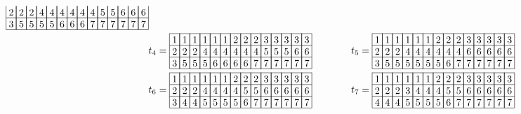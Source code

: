 \begin{align*}
\begin{array}[c]{*{14}c}
\lr{2}&\lr{2}&\lr{2}&\lr{4}&\lr{4}&\lr{4}&\lr{4}&\lr{4}&\lr{4}&\lr{5}&\lr{5}&\lr{6}&\lr{6}&\lr{6}\\\cline{1-14}
\lr{3}&\lr{5}&\lr{5}&\lr{5}&\lr{5}&\lr{6}&\lr{6}&\lr{6}&\lr{7}&\lr{7}&\lr{7}&\lr{7}&\lr{7}&\lr{7}\\\cline{1-14}
\end{array}\\
    &t_4 = \begin{array}[c]{*{14}c}\cline{1-14}
\lr{1}&\lr{1}&\lr{1}&\lr{1}&\lr{1}&\lr{1}&\lr{2}&\lr{2}&\lr{2}&\lr{3}&\lr{3}&\lr{3}&\lr{3}&\lr{3}\\\cline{1-14}
\lr{2}&\lr{2}&\lr{2}&\lr{4}&\lr{4}&\lr{4}&\lr{4}&\lr{4}&\lr{4}&\lr{5}&\lr{5}&\lr{5}&\lr{6}&\lr{6}\\\cline{1-14}
\lr{3}&\lr{5}&\lr{5}&\lr{5}&\lr{6}&\lr{6}&\lr{6}&\lr{6}&\lr{7}&\lr{7}&\lr{7}&\lr{7}&\lr{7}&\lr{7}\\\cline{1-14}
\end{array}\hspace{30pt}
    &t_5 = \begin{array}[c]{*{14}c}\cline{1-14}
\lr{1}&\lr{1}&\lr{1}&\lr{1}&\lr{1}&\lr{1}&\lr{2}&\lr{2}&\lr{2}&\lr{3}&\lr{3}&\lr{3}&\lr{3}&\lr{3}\\\cline{1-14}
\lr{2}&\lr{2}&\lr{2}&\lr{4}&\lr{4}&\lr{4}&\lr{4}&\lr{4}&\lr{4}&\lr{6}&\lr{6}&\lr{6}&\lr{6}&\lr{6}\\\cline{1-14}
\lr{3}&\lr{5}&\lr{5}&\lr{5}&\lr{5}&\lr{5}&\lr{5}&\lr{6}&\lr{7}&\lr{7}&\lr{7}&\lr{7}&\lr{7}&\lr{7}\\\cline{1-14}
\end{array}\\
    &t_6 = \begin{array}[c]{*{14}c}\cline{1-14}
\lr{1}&\lr{1}&\lr{1}&\lr{1}&\lr{1}&\lr{1}&\lr{2}&\lr{2}&\lr{2}&\lr{3}&\lr{3}&\lr{3}&\lr{3}&\lr{3}\\\cline{1-14}
\lr{2}&\lr{2}&\lr{2}&\lr{4}&\lr{4}&\lr{4}&\lr{4}&\lr{5}&\lr{5}&\lr{6}&\lr{6}&\lr{6}&\lr{6}&\lr{6}\\\cline{1-14}
\lr{3}&\lr{4}&\lr{4}&\lr{5}&\lr{5}&\lr{5}&\lr{5}&\lr{6}&\lr{7}&\lr{7}&\lr{7}&\lr{7}&\lr{7}&\lr{7}\\\cline{1-14}
\end{array}\hspace{30pt}
    &t_7 = \begin{array}[c]{*{14}c}\cline{1-14}
\lr{1}&\lr{1}&\lr{1}&\lr{1}&\lr{1}&\lr{1}&\lr{2}&\lr{2}&\lr{2}&\lr{3}&\lr{3}&\lr{3}&\lr{3}&\lr{3}\\\cline{1-14}
\lr{2}&\lr{2}&\lr{2}&\lr{3}&\lr{4}&\lr{4}&\lr{4}&\lr{5}&\lr{5}&\lr{6}&\lr{6}&\lr{6}&\lr{6}&\lr{6}\\\cline{1-14}
\lr{4}&\lr{4}&\lr{4}&\lr{5}&\lr{5}&\lr{5}&\lr{5}&\lr{6}&\lr{7}&\lr{7}&\lr{7}&\lr{7}&\lr{7}&\lr{7}\\\cline{1-14}
\end{array}
\end{align*}

